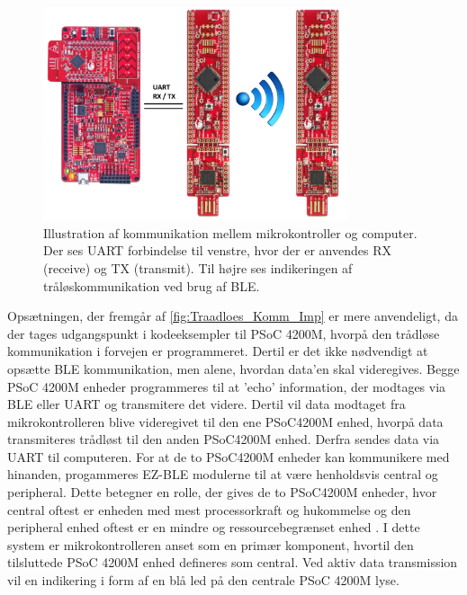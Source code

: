 \begin{figure}[H]
	\centering
	\includegraphics[width=0.8\textwidth]{figures/Traadloes_Komm_Imp}
	\caption{Illustration af kommunikation mellem mikrokontroller og computer. Der ses UART forbindelse til venstre, hvor der er anvendes RX (receive) og TX (transmit). Til højre ses indikeringen af tråløskommunikation ved brug af BLE.} 
	\label{fig:Traadloes_Komm_Imp}
\end{figure}

Opsætningen, der fremgår af \autoref{fig:Traadloes_Komm_Imp} er mere anvendeligt, da der tages udgangspunkt i kodeeksempler til PSoC 4200M, hvorpå den trådløse kommunikation i forvejen er programmeret. Dertil er det ikke nødvendigt at opsætte BLE kommunikation, men alene, hvordan data'en skal videregives. 
Begge PSoC 4200M enheder programmeres til at 'echo' information, der modtages via BLE eller UART og transmitere det videre. Dertil vil data modtaget fra mikrokontrolleren blive videregivet til den ene PSoC4200M enhed, hvorpå data transmiteres trådløst til den anden PSoC4200M enhed. Derfra sendes data via UART til computeren. 
For at de to PSoC4200M enheder kan kommunikere med hinanden, progammeres EZ-BLE modulerne til at være henholdsvis central og peripheral. Dette betegner en rolle, der gives de to PSoC4200M enheder, hvor central oftest er enheden med mest processorkraft og hukommelse og den peripheral enhed oftest er en mindre og ressourcebegrænset enhed \citep{townsend2014}. I dette system er mikrokontrolleren anset som en primær komponent, hvortil den tilsluttede PSoC 4200M enhed defineres som central. Ved aktiv data transmission vil en indikering i form af en blå led på den centrale PSoC 4200M lyse.